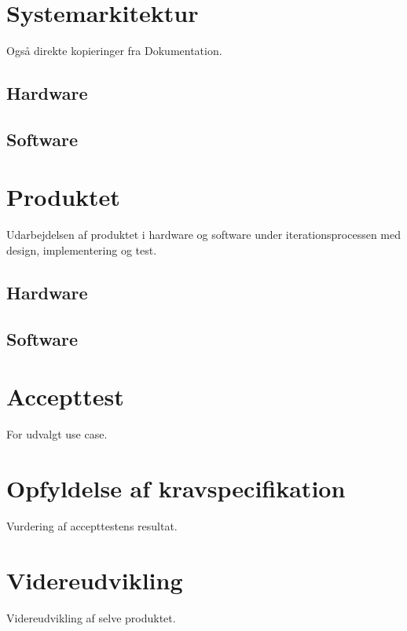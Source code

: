\section{Systemarkitektur}
Også direkte kopieringer fra Dokumentation.

\subsection{Hardware}

\subsection{Software}


\section{Produktet}

Udarbejdelsen af produktet i hardware og software under iterationsprocessen med design, implementering og test.

\subsection{Hardware}

\subsection{Software}


\section{Accepttest}

For udvalgt use case.


\section{Opfyldelse af kravspecifikation}
Vurdering af accepttestens resultat.


\section{Videreudvikling}
Videreudvikling af selve produktet.

